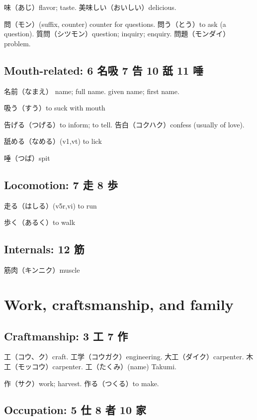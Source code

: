 味（あじ）flavor; taste.
美味しい（おいしい）delicious.

問（モン）(suffix, counter) counter for questions.
問う（とう）to ask (a question).
質問（シツモン）question; inquiry; enquiry.
問題（モンダイ）problem.

\subsection{Mouth-related: 6 名吸 7 告 10 舐 11 唾}

名前（なまえ）
name; full name.
given name; first name.

吸う（すう）to suck with mouth

告げる（つげる）to inform; to tell.
告白（コクハク）confess (usually of love).

舐める（なめる）(v1,vt) to lick

唾（つば）spit

\subsection{Locomotion: 7 走 8 歩}

走る（はしる）(v5r,vi) to run

歩く（あるく）to walk

\subsection{Internals: 12 筋}

筋肉（キンニク）muscle

\section{Work, craftsmanship, and family}

\subsection{Craftmanship: 3 工 7 作}

工（コウ、ク）craft.
工学（コウガク）engineering.
大工（ダイク）carpenter.
木工（モッコウ）carpenter.
工（たくみ）(name) Takumi.

作（サク）work; harvest.
作る（つくる）to make.

\subsection{Occupation: 5 仕 8 者 10 家}

